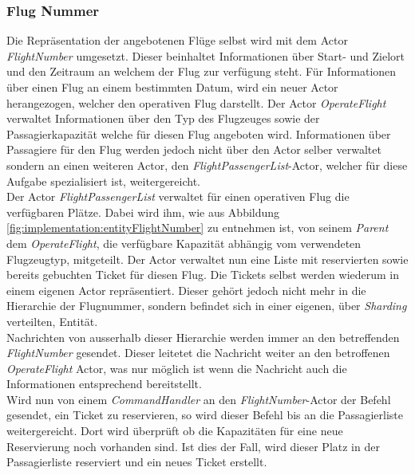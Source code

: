 \subsubsection{Flug Nummer}
Die Repräsentation der angebotenen Flüge selbst wird mit dem Actor \textit{FlightNumber} umgesetzt. Dieser beinhaltet Informationen über Start- und Zielort und den Zeitraum an welchem der Flug zur verfügung steht. Für Informationen über einen Flug an einem bestimmten Datum, wird ein neuer Actor herangezogen, welcher den operativen Flug darstellt. Der Actor \textit{OperateFlight} verwaltet Informationen über den Typ des Flugzeuges sowie der Passagierkapazität welche für diesen Flug angeboten wird. Informationen über Passagiere für den Flug werden jedoch nicht über den Actor selber verwaltet sondern an einen weiteren Actor, den \textit{FlightPassengerList}-Actor, welcher für diese Aufgabe spezialisiert ist, weitergereicht. \\
Der Actor \textit{FlightPassengerList} verwaltet für einen operativen Flug die verfügbaren Plätze. Dabei wird ihm, wie aus Abbildung \ref{fig:implementation:entityFlightNumber} zu entnehmen ist, von seinem \textit{Parent} dem \textit{OperateFlight}, die verfügbare Kapazität abhängig vom verwendeten Flugzeugtyp, mitgeteilt. Der Actor verwaltet nun eine Liste mit reservierten sowie bereits gebuchten Ticket für diesen Flug. Die Tickets selbst werden wiederum in einem eigenen Actor repräsentiert. Dieser gehört jedoch nicht mehr in die Hierarchie der Flugnummer, sondern befindet sich in einer eigenen, über \textit{Sharding} verteilten, Entität. \\
Nachrichten von ausserhalb dieser Hierarchie werden immer an den betreffenden \textit{FlightNumber} gesendet. Dieser leitetet die Nachricht weiter an den betroffenen \textit{OperateFlight} Actor, was nur möglich ist wenn die Nachricht auch die Informationen entsprechend bereitstellt. \\
Wird nun von einem \textit{CommandHandler} an den \textit{FlightNumber}-Actor der Befehl gesendet, ein Ticket zu reservieren, so wird dieser Befehl bis an die Passagierliste weitergereicht. Dort wird überprüft ob die Kapazitäten für eine neue Reservierung noch vorhanden sind. Ist dies der Fall, wird dieser Platz in der Passagierliste reserviert und ein neues Ticket erstellt. 
